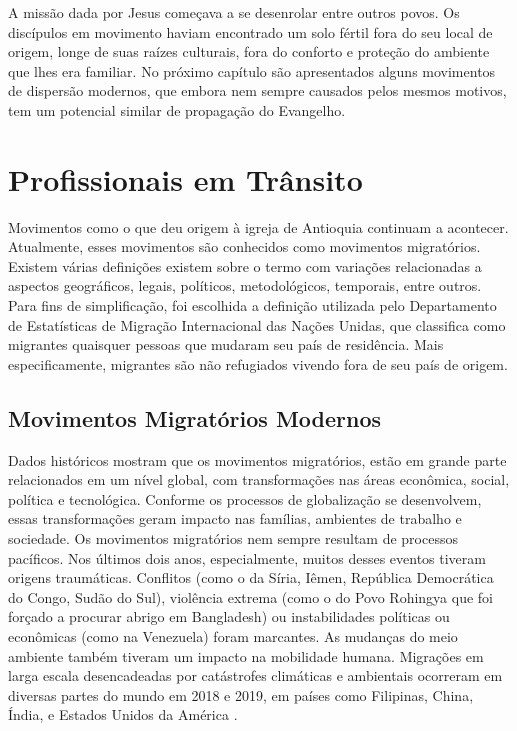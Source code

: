 \documentclass[12pt,openright,oneside,a4paper]{abntex2}
\begin{document}
A missão dada por Jesus começava a se desenrolar entre outros povos. Os discípulos em movimento haviam encontrado um solo fértil fora do seu local de origem, longe de suas raízes culturais, fora do conforto e proteção do ambiente que lhes era familiar. No próximo capítulo são apresentados alguns movimentos de dispersão modernos, que embora nem sempre causados pelos mesmos motivos, tem um potencial similar de propagação do Evangelho.

\chapter{Profissionais em Trânsito}

Movimentos como o que deu origem à igreja de Antioquia continuam a acontecer. Atualmente, esses movimentos são conhecidos como movimentos migratórios. Existem várias definições existem sobre o termo com variações relacionadas a aspectos geográficos, legais, políticos, metodológicos, temporais, entre outros\cite{iom2020}. Para fins de simplificação, foi escolhida a definição utilizada pelo Departamento de Estatísticas de Migração Internacional das Nações Unidas, que classifica como migrantes quaisquer pessoas que mudaram seu país de residência. Mais especificamente, migrantes são não refugiados vivendo fora de seu país de origem. 

\section {Movimentos Migratórios Modernos}

Dados históricos mostram que os movimentos migratórios, estão em grande parte relacionados em um nível global, com transformações nas áreas econômica, social, política e tecnológica. Conforme os processos de globalização se desenvolvem, essas transformações geram impacto nas famílias, ambientes de trabalho e sociedade. Os movimentos migratórios nem sempre resultam de processos pacíficos. Nos últimos dois anos, especialmente, muitos desses eventos tiveram origens traumáticas. Conflitos (como o da Síria, Iêmen, República Democrática do Congo, Sudão do Sul), violência extrema (como o do Povo Rohingya que foi forçado a procurar abrigo em Bangladesh) ou instabilidades políticas ou econômicas (como na Venezuela) foram marcantes. As mudanças do meio ambiente também tiveram um impacto na mobilidade humana. Migrações em larga escala desencadeadas por catástrofes climáticas e ambientais ocorreram em diversas partes do mundo em 2018 e 2019, em países como Filipinas, China, Índia, e Estados Unidos da América \cite[p. 19]{iom2020}.
\end{document}
